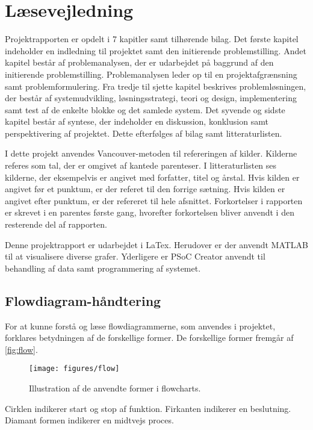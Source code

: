 \section*{Læsevejledning}
Projektrapporten er opdelt i 7 kapitler samt tilhørende bilag. Det første kapitel indeholder en indledning til projektet samt den initierende problemstilling. Andet kapitel består af problemanalysen, der er udarbejdet på baggrund af den initierende problemstilling. Problemanalysen leder op til en projektafgrænsning samt problemformulering. Fra tredje til sjette kapitel beskrives problemløsningen, der består af systemudvikling, løsningsstrategi, teori og design, implementering samt test af de enkelte blokke og det samlede system. Det syvende og sidste kapitel består af syntese, der indeholder en diskussion, konklusion samt perspektivering af projektet. Dette efterfølges af bilag samt litteraturlisten. 

I dette projekt anvendes Vancouver-metoden til refereringen af kilder. Kilderne referes som tal, der er omgivet af kantede parenteser. I litteraturlisten ses kilderne, der eksempelvis er angivet med forfatter, titel og årstal. Hvis kilden er angivet før et punktum, er der referet til den forrige sætning. Hvis kilden er angivet efter punktum, er der refereret til hele afsnittet. Forkortelser i rapporten er skrevet i en parentes første gang, hvorefter forkortelsen bliver anvendt i den resterende del af rapporten.
 
Denne projektrapport er udarbejdet i LaTex. Herudover er der anvendt MATLAB  til at visualisere diverse grafer. Yderligere er PSoC Creator anvendt til behandling af data samt programmering af systemet.  


\subsection*{Flowdiagram-håndtering} \label{sec:flowhaandtering}
For at kunne forstå og læse flowdiagrammerne, som anvendes i projektet, forklares betydningen af de forskellige former. De forskellige former fremgår af \autoref{fig:flow}.

\begin{figure}[H]
\centering
\texttt{[image: figures/flow]}
\caption{Illustration af de anvendte former i flowcharts.}
\label{fig:flow}
\end{figure}

\noindent
Cirklen indikerer start og stop af funktion. Firkanten indikerer en beslutning. Diamant formen indikerer en midtvejs proces.